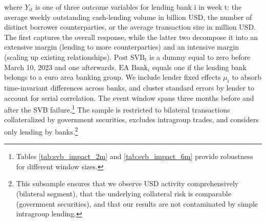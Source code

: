 \documentclass[english, 12pt, oneside]{article}
\begin{document}
where $Y_{it}$ is one of three outcome variables for lending bank i in week t: the average weekly outstanding cash-lending volume in billion USD, the number of distinct borrower counterparties, or the average transaction size in million USD. The first captures the overall response, while the latter two decompose it into an extensive margin (lending to more counterparties) and an intensive margin (scaling up existing relationships). $\text{Post SVB}_t$ is a dummy equal to zero before March 10, 2023 and one afterwards. $\text{EA Bank}_i$ equals one if the lending bank belongs to a euro area banking group. We include lender fixed effects $\mu_i$ to absorb time-invariant differences across banks, and cluster standard errors by lender to account for serial correlation. The event window spans three months before and after the SVB failure.\footnote{Tables \ref{tab:svb_impact_2m} and \ref{tab:svb_impact_6m} provide robustness for different window sizes.} The sample is restricted to bilateral transactions collateralized by government securities, excludes intragroup trades, and considers only lending by banks.\footnote{This subsample ensures that we observe USD activity comprehensively (bilateral segment), that the underlying collateral risk is comparable (government securities), and that our results are not contaminated by simple intragroup lending.}
\end{document}
